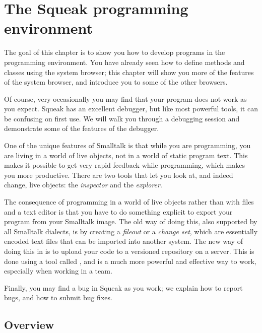 \documentclass[a4paper,10pt,twoside]{book}
\begin{document}
	\renewcommand{\nnbb}[2]{} %
	\sloppy
\fi
\chapter{The Squeak programming environment}
\label{cha:env}

The goal of this chapter is to show you how to develop programs in the \Squeak programming environment.
You have already seen how to define methods and classes using the system browser; this chapter will show you more of the features of the system browser, and introduce you to some of the other browsers.

Of course, very occasionally you may find that your program does not work as you expect. Squeak has an excellent debugger, but like most powerful tools, it can be confusing on first use.  We will walk you through a debugging session and demonstrate some of the features of the debugger. 

One of the unique features of Smalltalk is that while you are programming, you are living in a world of live objects, not in a world of static program text.  This makes it possible to get very rapid feedback while programming, which makes you more productive. There are two tools that let you look at, and indeed change, live objects: the \emph{inspector} and the \emph{explorer}.

The consequence of programming in a world of live objects rather than with files and a text editor is that you have to do something explicit to export your program from your Smalltalk image.  
The old way of doing this, also supported by all Smalltalk dialects, is by creating a \emph{fileout} or a \emph{change set}, which are essentially encoded text files that can be imported into another system.  
The new way of doing this in \Squeak is to upload your code to a versioned repository on a server.  This is done using a tool called , and is a much more powerful and effective way to work, especially when working in a team.

Finally, you may find a bug in Squeak as you work; we explain how to report bugs, and how to submit bug fixes.

\section{Overview}
\label{sec:overview}
\end{document}
